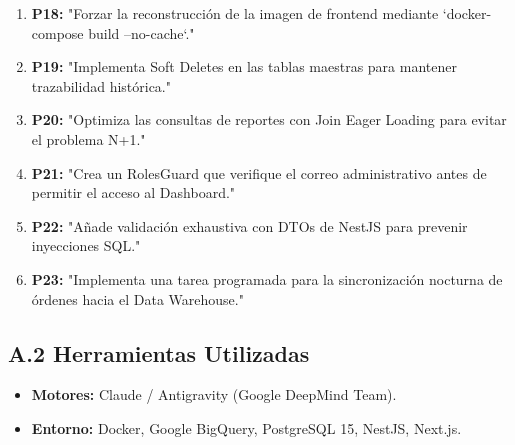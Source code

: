 \documentclass[11pt,a4paper]{article}
\begin{document}
\begin{enumerate}[itemsep=0pt, parsep=0pt]
    \item \textbf{P18:} "Forzar la reconstrucción de la imagen de frontend mediante `docker-compose build --no-cache`."
    \item \textbf{P19:} "Implementa Soft Deletes en las tablas maestras para mantener trazabilidad histórica."
    \item \textbf{P20:} "Optimiza las consultas de reportes con Join Eager Loading para evitar el problema N+1."
    \item \textbf{P21:} "Crea un RolesGuard que verifique el correo administrativo antes de permitir el acceso al Dashboard."
    \item \textbf{P22:} "Añade validación exhaustiva con DTOs de NestJS para prevenir inyecciones SQL."
    \item \textbf{P23:} "Implementa una tarea programada para la sincronización nocturna de órdenes hacia el Data Warehouse."
\end{enumerate}

\subsection{A.2 Herramientas Utilizadas}
\begin{itemize}
    \item \textbf{Motores:} Claude / Antigravity (Google DeepMind Team).
    \item \textbf{Entorno:} Docker, Google BigQuery, PostgreSQL 15, NestJS, Next.js.
\end{itemize}
\end{document}
